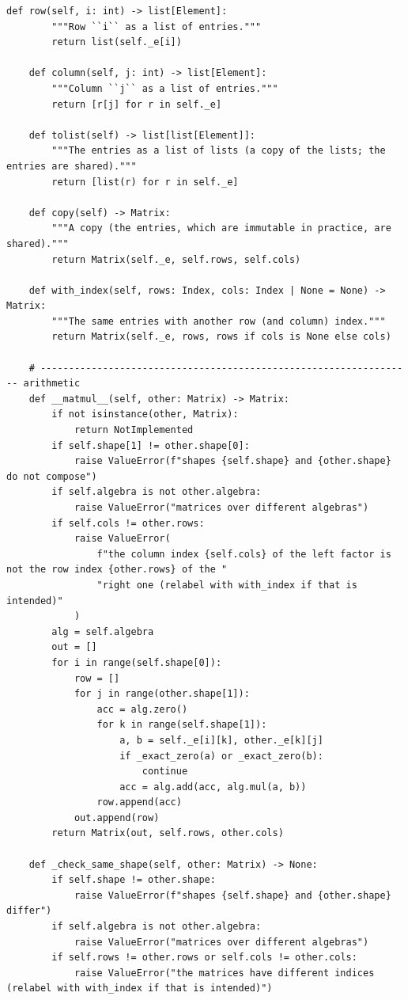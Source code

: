 \documentclass[12pt, a4paper]{report}
\theoremstyle{plain}
\theoremstyle{definition}
\theoremstyle{remark}
\theoremstyle{plain}
\begin{document}
\begin{lstlisting}[style=dsqcode]
    def row(self, i: int) -> list[Element]:
        """Row ``i`` as a list of entries."""
        return list(self._e[i])

    def column(self, j: int) -> list[Element]:
        """Column ``j`` as a list of entries."""
        return [r[j] for r in self._e]

    def tolist(self) -> list[list[Element]]:
        """The entries as a list of lists (a copy of the lists; the entries are shared)."""
        return [list(r) for r in self._e]

    def copy(self) -> Matrix:
        """A copy (the entries, which are immutable in practice, are shared)."""
        return Matrix(self._e, self.rows, self.cols)

    def with_index(self, rows: Index, cols: Index | None = None) -> Matrix:
        """The same entries with another row (and column) index."""
        return Matrix(self._e, rows, rows if cols is None else cols)

    # ------------------------------------------------------------------ arithmetic
    def __matmul__(self, other: Matrix) -> Matrix:
        if not isinstance(other, Matrix):
            return NotImplemented
        if self.shape[1] != other.shape[0]:
            raise ValueError(f"shapes {self.shape} and {other.shape} do not compose")
        if self.algebra is not other.algebra:
            raise ValueError("matrices over different algebras")
        if self.cols != other.rows:
            raise ValueError(
                f"the column index {self.cols} of the left factor is not the row index {other.rows} of the "
                "right one (relabel with with_index if that is intended)"
            )
        alg = self.algebra
        out = []
        for i in range(self.shape[0]):
            row = []
            for j in range(other.shape[1]):
                acc = alg.zero()
                for k in range(self.shape[1]):
                    a, b = self._e[i][k], other._e[k][j]
                    if _exact_zero(a) or _exact_zero(b):
                        continue
                    acc = alg.add(acc, alg.mul(a, b))
                row.append(acc)
            out.append(row)
        return Matrix(out, self.rows, other.cols)

    def _check_same_shape(self, other: Matrix) -> None:
        if self.shape != other.shape:
            raise ValueError(f"shapes {self.shape} and {other.shape} differ")
        if self.algebra is not other.algebra:
            raise ValueError("matrices over different algebras")
        if self.rows != other.rows or self.cols != other.cols:
            raise ValueError("the matrices have different indices (relabel with with_index if that is intended)")


\end{lstlisting}
\end{document}
